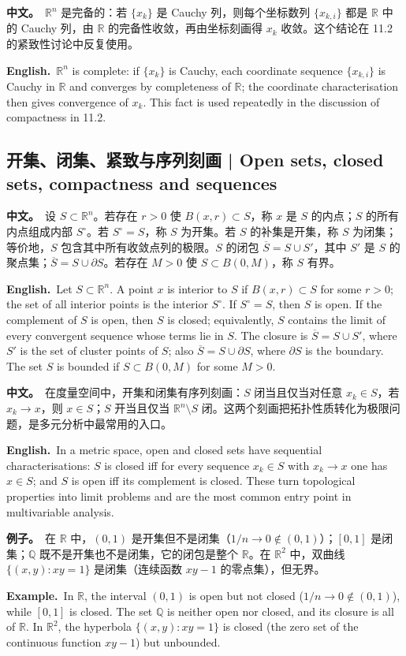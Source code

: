 \documentclass[UTF8,11pt,a4paper]{ctexart}
\newcommand{\BOTH}[2]{\par\noindent\textbf{中文。}\ #1\par\noindent\textbf{English.}\ #2\par}
\newcommand{\EX}[2]{\par\noindent\textbf{例子。}\ #1\par\noindent\textbf{Example.}\ #2\par}
\begin{document}
\BOTH{$\mathbb R^n$ 是完备的：若 $\{x_k\}$ 是 Cauchy 列，则每个坐标数列 $\{x_{k,i}\}$ 都是 $\mathbb R$ 中的 Cauchy 列，由 $\mathbb R$ 的完备性收敛，再由坐标刻画得 $x_k$ 收敛。这个结论在 11.2 的紧致性讨论中反复使用。}{$\mathbb R^n$ is complete: if $\{x_k\}$ is Cauchy, each coordinate sequence $\{x_{k,i}\}$ is Cauchy in $\mathbb R$ and converges by completeness of $\mathbb R$; the coordinate characterisation then gives convergence of $x_k$. This fact is used repeatedly in the discussion of compactness in 11.2.}

\subsection{开集、闭集、紧致与序列刻画 | Open sets, closed sets, compactness and sequences}
\BOTH{设 $S\subset\mathbb R^n$。若存在 $r>0$ 使 $B(x,r)\subset S$，称 $x$ 是 $S$ 的内点；$S$ 的所有内点组成内部 $S^\circ$。若 $S^\circ=S$，称 $S$ 为开集。若 $S$ 的补集是开集，称 $S$ 为闭集；等价地，$S$ 包含其中所有收敛点列的极限。$S$ 的闭包 $\overline S=S\cup S'$，其中 $S'$ 是 $S$ 的聚点集；$\overline S=S\cup\partial S$。若存在 $M>0$ 使 $S\subset B(0,M)$，称 $S$ 有界。}{Let $S\subset\mathbb R^n$. A point $x$ is interior to $S$ if $B(x,r)\subset S$ for some $r>0$; the set of all interior points is the interior $S^\circ$. If $S^\circ=S$, then $S$ is open. If the complement of $S$ is open, then $S$ is closed; equivalently, $S$ contains the limit of every convergent sequence whose terms lie in $S$. The closure is $\overline S=S\cup S'$, where $S'$ is the set of cluster points of $S$; also $\overline S=S\cup\partial S$, where $\partial S$ is the boundary. The set $S$ is bounded if $S\subset B(0,M)$ for some $M>0$.}
\BOTH{在度量空间中，开集和闭集有序列刻画：$S$ 闭当且仅当对任意 $x_k\in S$，若 $x_k\to x$，则 $x\in S$；$S$ 开当且仅当 $\mathbb R^n\setminus S$ 闭。这两个刻画把拓扑性质转化为极限问题，是多元分析中最常用的入口。}{In a metric space, open and closed sets have sequential characterisations: $S$ is closed iff for every sequence $x_k\in S$ with $x_k\to x$ one has $x\in S$; and $S$ is open iff its complement is closed. These turn topological properties into limit problems and are the most common entry point in multivariable analysis.}
\EX{在 $\mathbb R$ 中，$(0,1)$ 是开集但不是闭集（$1/n\to0\notin(0,1)$）；$[0,1]$ 是闭集；$\mathbb Q$ 既不是开集也不是闭集，它的闭包是整个 $\mathbb R$。在 $\mathbb R^2$ 中，双曲线 $\{(x,y):xy=1\}$ 是闭集（连续函数 $xy-1$ 的零点集），但无界。}{In $\mathbb R$, the interval $(0,1)$ is open but not closed ($1/n\to0\notin(0,1)$), while $[0,1]$ is closed. The set $\mathbb Q$ is neither open nor closed, and its closure is all of $\mathbb R$. In $\mathbb R^2$, the hyperbola $\{(x,y):xy=1\}$ is closed (the zero set of the continuous function $xy-1$) but unbounded.}
\end{document}
